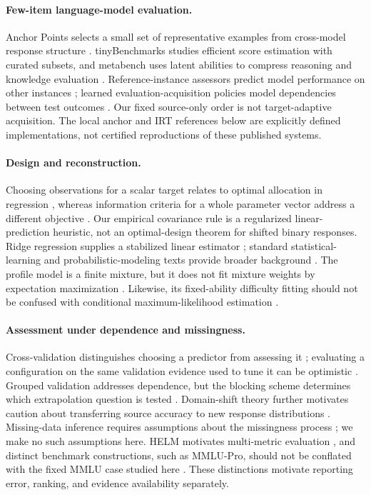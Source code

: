 \documentclass{article}
\begin{document}
\paragraph{Few-item language-model evaluation.}
Anchor Points selects a small set of representative examples from cross-model response structure \citep{Vivek2024}. tinyBenchmarks studies efficient score estimation with curated subsets, and metabench uses latent abilities to compress reasoning and knowledge evaluation \citep{Polo2024,Kipnis2025}. Reference-instance assessors predict model performance on other instances \citep{Pacchiardi2024}; learned evaluation-acquisition policies model dependencies between test outcomes \citep{Li2025}. Our fixed source-only order is not target-adaptive acquisition. The local anchor and IRT references below are explicitly defined implementations, not certified reproductions of these published systems.

\paragraph{Design and reconstruction.}
Choosing observations for a scalar target relates to optimal allocation in regression \citep{Elfving1952}, whereas information criteria for a whole parameter vector address a different objective \citep{Kiefer1960}. Our empirical covariance rule is a regularized linear-prediction heuristic, not an optimal-design theorem for shifted binary responses. Ridge regression supplies a stabilized linear estimator \citep{Hoerl1970}; standard statistical-learning and probabilistic-modeling texts provide broader background \citep{Hastie2009,Bishop2006}. The profile model is a finite mixture, but it does not fit mixture weights by expectation maximization \citep{Dempster1977}. Likewise, its fixed-ability difficulty fitting should not be confused with conditional maximum-likelihood estimation \citep{Andersen1970}.

\paragraph{Assessment under dependence and missingness.}
Cross-validation distinguishes choosing a predictor from assessing it \citep{Stone1974,Arlot2010}; evaluating a configuration on the same validation evidence used to tune it can be optimistic \citep{Varma2006}. Grouped validation addresses dependence, but the blocking scheme determines which extrapolation question is tested \citep{Roberts2017}. Domain-shift theory further motivates caution about transferring source accuracy to new response distributions \citep{BenDavid2010}. Missing-data inference requires assumptions about the missingness process \citep{Rubin1976,Little2019}; we make no such assumptions here. HELM motivates multi-metric evaluation \citep{Liang2023}, and distinct benchmark constructions, such as MMLU-Pro, should not be conflated with the fixed MMLU case studied here \citep{Wang2024}. These distinctions motivate reporting error, ranking, and evidence availability separately.
\end{document}
